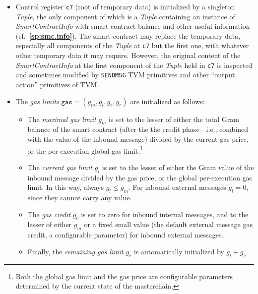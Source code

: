 \documentclass[12pt,oneside]{article}
\def\refpoint#1{{\rm\textbf{\ref{#1}}}}
\let\ptref=\refpoint
\begin{document}
\begin{itemize}
\item Control register {\tt c7} (root of temporary data) is initialized by a singleton {\em Tuple}, the only component of which is a {\em Tuple\/} containing an instance of {\em SmartContractInfo\/} with smart contract balance and other useful information (cf.~\ptref{sp:smc.info}). The smart contract may replace the temporary data, especially all components of the {\em Tuple\/} at {\tt c7} but the first one, with whatever other temporary data it may require. However, the original content of the {\em SmartContractInfo\/} at the first component of the {\em Tuple\/} held in {\tt c7} is inspected and sometimes modified by {\tt SENDMSG} TVM primitives and other ``output action'' primitives of TVM.
\item The {\em gas limits\/} $\texttt{gas}=(g_m,g_l,g_c,g_r)$ are initialized as follows:
  \begin{itemize}
  \item The {\em maximal gas limit\/} $g_m$ is set to the lesser of either the total Gram balance of the smart contract (after the the credit phase---i.e., combined with the value of the inbound message) divided by the current gas price, or the per-execution global gas limit.\footnote{Both the global gas limit and the gas price are configurable parameters determined by the current state of the masterchain.}
  \item The {\em current gas limit\/} $g_l$ is set to the lesser of either the Gram value of the inbound message divided by the gas price, or the global per-execution gas limit. In this way, always $g_l\leq g_m$. For inbound external messages $g_l=0$, since they cannot carry any value.
  \item The {\em gas credit\/} $g_c$ is set to zero for inbound internal messages, and to the lesser of either $g_m$ or a fixed small value (the default external message gas credit, a configurable parameter) for inbound external messages.
  \item Finally, the {\em remaining gas limit\/} $g_r$ is automatically initialized by $g_l+g_c$.
  \end{itemize}
\end{itemize}
\end{document}
